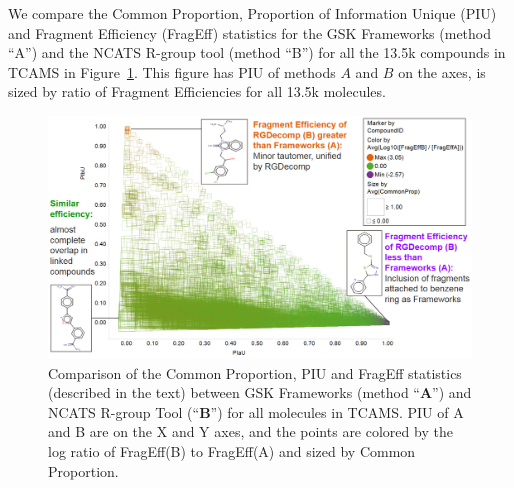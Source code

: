 \documentclass[journal=jacsat,manuscript=article]{achemso}
\newcommand*\fref[1]{Figure~\ref{fig:#1}}
\begin{document}
We compare the Common Proportion, Proportion of Information Unique (PIU) and Fragment Efficiency (FragEff) statistics for the GSK Frameworks (method ``A'') and the NCATS R-group tool (method ``B'') for all the 13.5k compounds in TCAMS in \fref{statcompare}.  This figure has PIU of methods $A$ and $B$ on the axes, is sized by ratio of Fragment Efficiencies for all 13.5k molecules.   



\begin{figure}
\includegraphics[width=6in]{fig/statcompare_frames_RGtool_transparent_density.png}
\caption{Comparison of the Common Proportion, PIU and FragEff statistics (described in the text) between GSK Frameworks (method ``{\bf A}'') and NCATS R-group Tool (``{\bf B}'') for all molecules in TCAMS. PIU of A and B are on the X and Y axes, and the points are colored by the log ratio of FragEff(B) to FragEff(A) and sized by Common Proportion.}
\label{fig:statcompare}
\end{figure}
 
\end{document}
